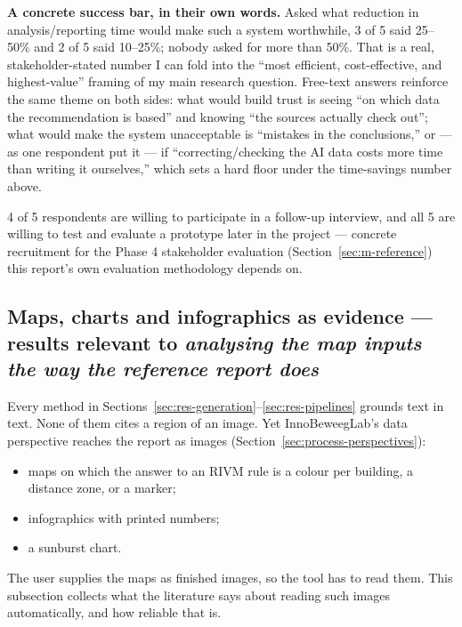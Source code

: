 \textbf{A concrete success bar, in their own words.} Asked what reduction in analysis/reporting time would make such a system worthwhile, 3 of 5 said 25–50\% and 2 of 5 said 10–25\%; nobody asked for more than 50\%. That is a real, stakeholder-stated number I can fold into the \textquotedblleft{}most efficient, cost-effective, and highest-value\textquotedblright{} framing of my main research question. Free-text answers reinforce the same theme on both sides: what would build trust is seeing \textquotedblleft{}on which data the recommendation is based\textquotedblright{} and knowing \textquotedblleft{}the sources actually check out\textquotedblright{}; what would make the system unacceptable is \textquotedblleft{}mistakes in the conclusions,\textquotedblright{} or — as one respondent put it — if \textquotedblleft{}correcting/checking the AI data costs more time than writing it ourselves,\textquotedblright{} which sets a hard floor under the time-savings number above.



4 of 5 respondents are willing to participate in a follow-up interview, and all 5 are willing to test and evaluate a prototype later in the project — concrete recruitment for the Phase 4 stakeholder evaluation (Section~\ref{sec:m-reference}) this report's own evaluation methodology depends on.



\subsection{Maps, charts and infographics as evidence --- results relevant to \textit{analysing the map inputs the way the reference report does}}\label{sec:res-maps}

Every method in Sections~\ref{sec:res-generation}--\ref{sec:res-pipelines} grounds text in text. None of them cites a region of an image. Yet InnoBeweegLab's data perspective reaches the report as images (Section~\ref{sec:process-perspectives}):
\begin{itemize}
\item maps on which the answer to an RIVM rule is a colour per building, a distance zone, or a marker;
\item infographics with printed numbers;
\item a sunburst chart.
\end{itemize}
The user supplies the maps as finished images, so the tool has to read them. This subsection collects what the literature says about reading such images automatically, and how reliable that is.

